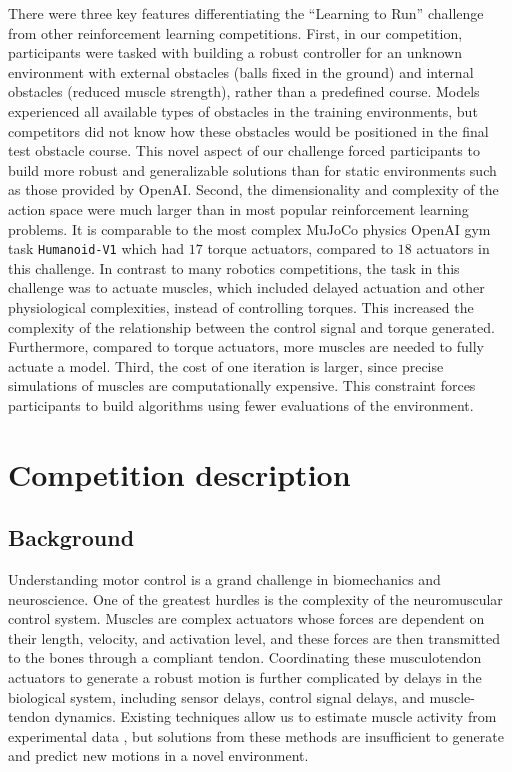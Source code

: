 \documentclass[graybox]{svmult}
\begin{document}
There were three key features differentiating the ``Learning to Run'' challenge from other reinforcement learning competitions. First, in our competition, participants were tasked with building a robust controller for an unknown environment with external obstacles (balls fixed in the ground) and internal obstacles (reduced muscle strength), rather than a predefined course. Models experienced all available types of obstacles in the training environments, but competitors did not know how these obstacles would be positioned in the final test obstacle course. This novel aspect of our challenge forced participants to build more robust and generalizable solutions than for static environments such as those provided by OpenAI. Second, the dimensionality and complexity of the action space were much larger than in most popular reinforcement learning problems. It is comparable to the most complex MuJoCo physics OpenAI gym task \verb|Humanoid-V1| \cite{brockman2016openai} which had $17$ torque actuators, compared to $18$ actuators in this challenge. In contrast to many robotics competitions, the task in this challenge was to actuate muscles, which included delayed actuation and other physiological complexities, instead of controlling torques. This increased the complexity of the relationship between the control signal and torque generated. Furthermore, compared to torque actuators, more muscles are needed to fully actuate a model. Third, the cost of one iteration is larger, since precise simulations of muscles are computationally expensive. This constraint forces participants to build algorithms using fewer evaluations of the environment.

\section{Competition description}

\subsection{Background}\label{ss:background}

Understanding motor control is a grand challenge in biomechanics and neuroscience. One of the greatest hurdles is the complexity of the neuromuscular control system. Muscles are complex actuators whose forces are dependent on their length, velocity, and activation level, and these forces are then transmitted to the bones through a compliant tendon. Coordinating these musculotendon actuators to generate a robust motion is further complicated by delays in the biological system, including sensor delays, control signal delays, and muscle-tendon dynamics. Existing techniques allow us to estimate muscle activity from experimental data \cite{thelen2003cmc}, but solutions from these methods are insufficient to generate and predict new motions in a novel environment.
\end{document}
